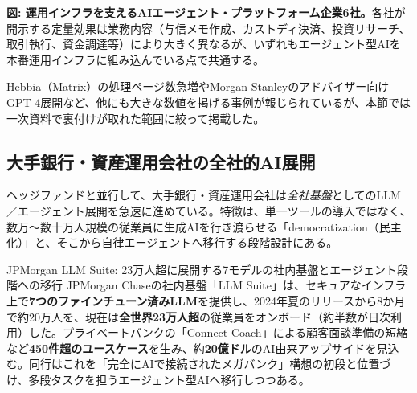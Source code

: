 \begin{center}
\end{center}

\smallskip
{\small\color{figgray}\textbf{図: 運用インフラを支えるAIエージェント・プラットフォーム企業6社。}}各社が開示する定量効果は業務内容（与信メモ作成、カストディ決済、投資リサーチ、取引執行、資金調達等）により大きく異なるが、いずれもエージェント型AIを本番運用インフラに組み込んでいる点で共通する。

Hebbia（Matrix）の処理ページ数急増やMorgan Stanleyのアドバイザー向けGPT-4展開など、他にも大きな数値を掲げる事例が報じられているが、本節では一次資料で裏付けが取れた範囲に絞って掲載した。

\subsection{大手銀行・資産運用会社の全社的AI展開}

ヘッジファンドと並行して、大手銀行・資産運用会社は\emph{全社基盤}としてのLLM／エージェント展開を急速に進めている。特徴は、単一ツールの導入ではなく、数万〜数十万人規模の従業員に生成AIを行き渡らせる「democratization（民主化）」と、そこから自律エージェントへ移行する段階設計にある。

\begin{casestudy}{JPMorgan LLM Suite: 23万人超に展開する7モデルの社内基盤とエージェント段階への移行}
JPMorgan Chaseの社内基盤「LLM Suite」は、セキュアなインフラ上で\textbf{7つのファインチューン済みLLM}を提供し、2024年夏のリリースから8か月で約20万人を、現在は\textbf{全世界23万人超}の従業員をオンボード（約半数が日次利用）した\cite{x03jpmorgan_ciodive2024,x03jpmorgan_cnbc2025}。プライベートバンクの「Connect Coach」による顧客面談準備の短縮など\textbf{450件超のユースケース}を生み、約\textbf{20億ドル}のAI由来アップサイドを見込む。同行はこれを「完全にAIで接続されたメガバンク」構想の初段と位置づけ、多段タスクを担うエージェント型AIへ移行しつつある\cite{x03jpmorgan_cnbc2025}。
\end{casestudy}

